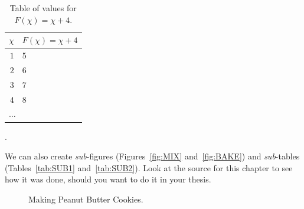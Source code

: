 \begin{table}[ht]
    \centering
    \caption{Table of values for $F(\chi)=\chi+4$.}
    \begin{tabular}[ht]{r|l}
	\hline
	$\chi$ & $F(\chi)=\chi+4$\\
	\hline
	$1$ & $5$\\
	$2$ & $6$\\
	$3$ & $7$\\
	$4$ & $8$\\
	\multicolumn{2}{l}{$\ldots$}\\
	\hline
    \end{tabular}
    \label{tab:EQUATION1_VALUES}.
\end{table}



We can also create \emph{sub}-figures (Figures~\ref{fig:MIX}
and~\ref{fig:BAKE}) and \emph{sub}-tables (Tables~\ref{tab:SUB1}
and~\ref{tab:SUB2}).  Look at the source for this chapter to see how
it was done, should you want to do it in your thesis.

\begin{figure}[!ht]
    \centering

    \caption{Making Peanut Butter Cookies.}
    \label{fig:PEANUTBCOOKIES}
\end{figure}


